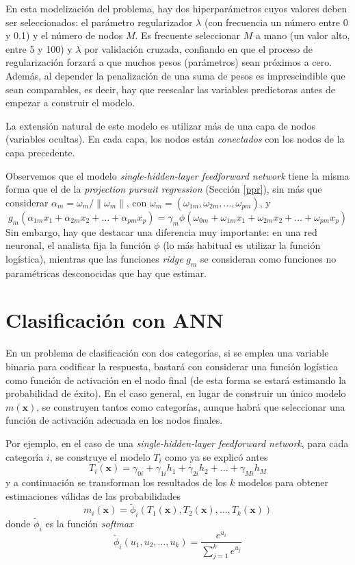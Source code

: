 \documentclass[
  spanish,
]{book}
\theoremstyle{break}
\theoremstyle{definition}
\theoremstyle{definition}
\theoremstyle{definition}
\theoremstyle{definition}
\theoremstyle{remark}
\begin{document}
En esta modelización del problema, hay dos hiperparámetros cuyos valores deben ser seleccionados: el parámetro regularizador \(\lambda\) (con frecuencia un número entre 0 y 0.1) y el número de nodos \(M\). Es frecuente seleccionar \(M\) a mano (un valor alto, entre 5 y 100) y \(\lambda\) por validación cruzada, confiando en que el proceso de regularización forzará a que muchos pesos (parámetros) sean próximos a cero. Además, al depender la penalización de una suma de pesos es imprescindible que sean comparables, es decir, hay que reescalar las variables predictoras antes de empezar a construir el modelo.

La extensión natural de este modelo es utilizar más de una capa de nodos (variables ocultas). En cada capa, los nodos están \emph{conectados} con los nodos de la capa precedente.

Observemos que el modelo \emph{single-hidden-layer feedforward network} tiene la misma forma que el de la \emph{projection pursuit regression} (Sección \ref{ppr}), sin más que considerar \(\alpha_m = \omega_m/\| \omega_m \|\), con \(\omega_m = (\omega_{1m}, \omega_{2m}, \ldots, \omega_{pm})\), y
\[g_m (\alpha_{1m}x_1 + \alpha_{2m}x_2 + \ldots + \alpha_{pm}x_p) = 
\gamma_m \phi(\omega_{0m} + \omega_{1m} x_1 + \omega_{2m} x_2 + \ldots + \omega_{pm} x_p)\]
Sin embargo, hay que destacar una diferencia muy importante: en una red neuronal, el analista fija la función \(\phi\) (lo más habitual es utilizar la función logística), mientras que las funciones \emph{ridge} \(g_m\) se consideran como funciones no paramétricas desconocidas que hay que estimar.

\hypertarget{clasificaciuxf3n-con-ann}{%
\section{Clasificación con ANN}\label{clasificaciuxf3n-con-ann}}

En un problema de clasificación con dos categorías, si se emplea una variable binaria para codificar la respuesta, bastará con considerar una función logística como función de activación en el nodo final (de esta forma se estará estimando la probabilidad de éxito).
En el caso general, en lugar de construir un único modelo \(m(\mathbf{x})\), se construyen tantos como categorías, aunque habrá que seleccionar una función de activación adecuada en los nodos finales.

Por ejemplo, en el caso de una \emph{single-hidden-layer feedforward network}, para cada categoría \(i\), se construye el modelo \(T_i\) como ya se explicó antes
\[T_i(\mathbf{x}) = \gamma_{0i} + \gamma_{1i} h_1 + \gamma_{2i} h_2 + \ldots + \gamma_{Mi} h_M \]
y a continuación se transforman los resultados de los \(k\) modelos para obtener estimaciones válidas de las probabilidades
\[m_i(\mathbf{x}) = \tilde{\phi}_i (T_1(\mathbf{x}), T_2(\mathbf{x}),\ldots, T_k(\mathbf{x})) \]
donde \(\tilde{\phi}_i\) es la función \emph{softmax}
\[\tilde{\phi}_i (u_1,u_2,\ldots,u_k) = \frac{e^{u_i}}{\sum_{j=1}^k e^{u_j}}\]
\end{document}
